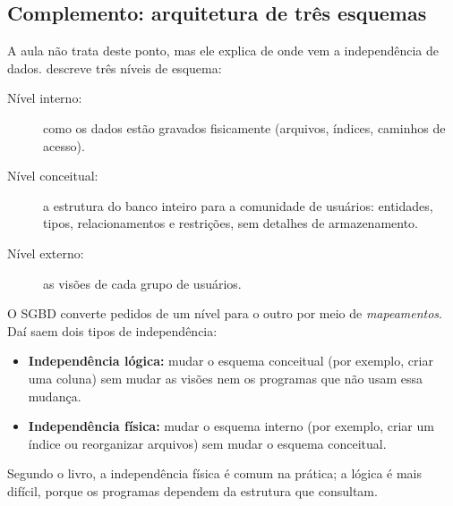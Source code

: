 \subsection*{Complemento: arquitetura de três esquemas}

A aula não trata deste ponto, mas ele explica de onde vem a
independência de dados. \textcite[seção 2.2]{Elmasri2011} descreve três
níveis de esquema:

\begin{description}
	\item[Nível interno:] como os dados estão gravados fisicamente
	(arquivos, índices, caminhos de acesso).
	\item[Nível conceitual:] a estrutura do banco inteiro para a
	comunidade de usuários: entidades, tipos, relacionamentos e
	restrições, sem detalhes de armazenamento.
	\item[Nível externo:] as visões de cada grupo de usuários.
\end{description}

O SGBD converte pedidos de um nível para o outro por meio de
\emph{mapeamentos}. Daí saem dois tipos de independência:

\begin{itemize}
	\item \textbf{Independência lógica:}
	mudar o esquema conceitual (por exemplo, criar uma coluna) sem mudar
	as visões nem os programas que não usam essa mudança.
	\item \textbf{Independência física:} mudar o esquema interno (por
	exemplo, criar um índice ou reorganizar arquivos) sem mudar o esquema
	conceitual.
\end{itemize}

Segundo o livro, a independência física é comum na prática; a lógica é
mais difícil, porque os programas dependem da estrutura que consultam.

